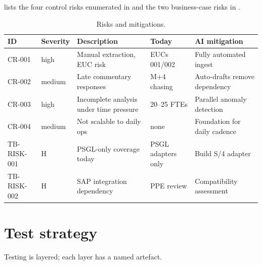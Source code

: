  lists the four control risks enumerated in
 and
the two business-case risks in
.

\begin{table}[htbp]
\caption{Risks and mitigations.}\label{tab:risks}
\centering
\footnotesize
\begin{tabularx}{\linewidth}{@{}llXlX@{}}
\toprule
\textbf{ID} & \textbf{Severity} & \textbf{Description} & \textbf{Today} & \textbf{AI mitigation} \\ \midrule
CR-001       & high     & Manual extraction, EUC risk       & EUCs 001/002 & Fully automated ingest \\
CR-002       & medium   & Late commentary responses         & M+4 chasing  & Auto-drafts remove dependency \\
CR-003       & high     & Incomplete analysis under time pressure & 20--25 FTEs  & Parallel anomaly detection \\
CR-004       & medium   & Not scalable to daily ops         & none         & Foundation for daily cadence \\
TB-RISK-001  & H        & PSGL-only coverage today          & PSGL adapters only & Build S/4 adapter \\
TB-RISK-002  & H        & SAP integration dependency        & PPE review   & Compatibility assessment \\
\bottomrule
\end{tabularx}
\end{table}

\section{Test strategy}

Testing is layered; each layer has a named artefact.

